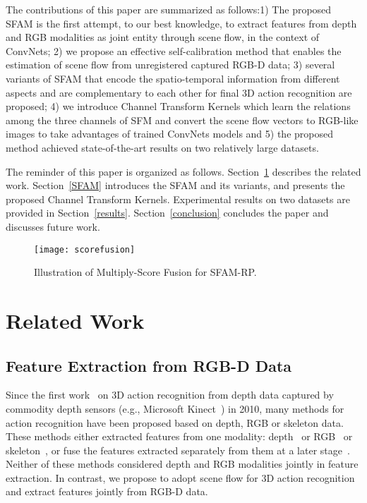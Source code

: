 \documentclass[10pt,twocolumn,letterpaper]{article}
\begin{document}
The contributions of this paper are summarized as follows:1) 
The proposed SFAM is the first attempt, to our best knowledge, to extract 
features from depth and RGB modalities as joint entity through scene flow, 
in the context of ConvNets; 2) we propose an effective self-calibration method 
that enables the estimation of scene flow from unregistered captured RGB-D data; 
3) several variants of SFAM that encode 
the spatio-temporal information from different aspects and are complementary 
to each other for final 3D action recognition are proposed;
4) we introduce Channel Transform Kernels which learn the relations among the 
three channels of SFM and convert the scene flow vectors to RGB-like images to 
take advantages of trained ConvNets models and 5) the proposed method achieved 
state-of-the-art results on two relatively large datasets. 


     
The reminder of this paper is organized as follows. Section~\ref{relatedwork} 
describes the 
related work. Section~\ref{SFAM} introduces the SFAM and its variants, and 
presents the proposed Channel Transform Kernels. Experimental results on two 
datasets are provided in Section~\ref{results}. Section~\ref{conclusion} 
concludes the paper and discusses future work. 


\begin{figure*}[t]
\begin{center}
{\texttt{[image: scorefusion]}}
\end{center}
\caption{Illustration of Multiply-Score Fusion for SFAM-RP. }
\label{scorefusion}
\end{figure*}


\section{Related Work}\label{relatedwork}

\subsection{Feature Extraction from RGB-D Data}
 Since the first work~\cite{li2010action} on 3D action recognition from depth 
data captured by commodity depth sensors (e.g., Microsoft Kinect~\texttrademark) 
in 2010, many 
methods for action recognition have been proposed based on depth, RGB or skeleton data. 
These methods either extracted features from one modality: 
depth~\cite{wang2012mining,Yang2012a,Oreifej2013,yangsuper,lurange,pichao2015,
pichaoTHMS} or RGB~\cite{ni2015pose,rahmani2015learning} or 
skeleton~\cite{vemulapalli2014human,pichao2014,pichao2016,du2015hierarchical,shahroudy2016ntu,pichaoSPL}, 
or fuse the features extracted separately from them at a later 
stage~\cite{Nie2015,Kong2015CVPR,hu2015jointly,
wu2015watch}. Neither of these methods considered 
depth and RGB modalities jointly in feature extraction. In contrast, we propose 
to adopt scene flow for 3D action recognition and extract features jointly from 
RGB-D data.
\end{document}
